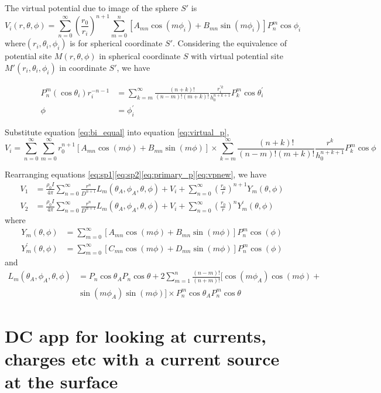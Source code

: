 \documentclass[11pt,letterpaper,leqno]{amsart}
\numberwithin{equation}{section}
\begin{document}
The virtual potential due to image of the sphere $S'$ is
\begin{equation}\label{eq:virtual_p}
V_i(r,\theta,\phi) = \sum\limits_{n=0}^\infty(\frac{r_0}{r_i})^{n+1}\sum\limits_{m=0}^n [A_{mn}\cos(m\phi_i) + B_{mn}\sin(m\phi_i)]P_n^m\cos\phi_i
\end{equation}
where$(r_i,\theta_i,\phi_i)$ is for spherical coordinate $S'$. Considering the equivalence of potential site $M(r,\theta,\phi)$ in spherical coordinate $S$ with virtual potential site $M'(r_i,\theta_i,\phi_i)$ in coordinate $S'$, we have

\begin{subequations}\label{eq:bi_equal}
\begin{align}
P_n^m(\cos\theta_i)r_i^{-n-1} &= \sum\limits_{k=m}^\infty \frac{(n+k)!}{(n-m)!(m+k)!}\frac{r_i^{\prime	k}}{h_0^{n+k+1}}P_k^m\cos\theta_i^\prime \\
\phi &= \phi_i^\prime
\end{align}
\end{subequations}

Substitute equation \eqref{eq:bi_equal} into equation \eqref{eq:virtual_p}, 
\begin{equation}\label{eq:vpnew}
V_i = \sum\limits_{n=0}^\infty\sum\limits_{m=0}^\infty r_0^{n+1}[A_{mn}\cos(m\phi) + B_{mn}\sin(m\phi)] \times \sum\limits_{k=m}^\infty\frac{(n+k)!}{(n-m)!(m+k)!}\frac{r^k}{h_0^{n+k+1}}P_k^m\cos\phi
\end{equation}

Rearranging equations \eqref{eq:sp1}\eqref{eq:sp2}\eqref{eq:primary_p}\eqref{eq:vpnew}, we have
\begin{align}
V_1 &= \frac{\rho_0 I}{4\pi}\sum\limits_{n=0}^\infty\frac{r^n}{D^{n+1}}L_m(\theta_A,\phi_A,\theta,\phi) + V_i + \sum\limits_{n=0}^\infty(\frac{r_0}{r})^{n+1}Y_m(\theta,\phi) \\
V_2 &= \frac{\rho_0 I}{4\pi}\sum\limits_{n=0}^\infty\frac{r^n}{D^{n+1}}L_m(\theta_A,\phi_A,\theta,\phi) + V_i + \sum\limits_{n=0}^\infty(\frac{r_0}{r})^{n}Y^\prime_m(\theta,\phi)
\end{align}
where
\begin{align}
Y_m(\theta,\phi) &= \sum\limits_{m=0}^\infty[A_{mn}\cos(m\phi)+B_{mn}\sin(m\phi)]P_n^m\cos(\phi) \\
Y_m^\prime(\theta,\phi) &= \sum\limits_{m=0}^\infty[C_{mn}\cos(m\phi)+D_{mn}\sin(m\phi)]P_n^m\cos(\phi) 
\end{align}
and
\begin{equation}
\begin{split}
L_m(\theta_A,\phi_A,\theta,\phi) &= P_n\cos\theta_A P_n\cos\theta + 2\sum\limits_{m=1}^n\frac{(n-m)!}{(n+m)!}[\cos(m\phi_A)\cos(m\phi) + \\
&\sin(m\phi_A)\sin(m\phi)] \times P_n^m\cos\theta_A P_n^m\cos\theta
\end{split}
\end{equation}

\section{DC app for looking at currents, charges etc with a current source at the surface}


\end{document}
